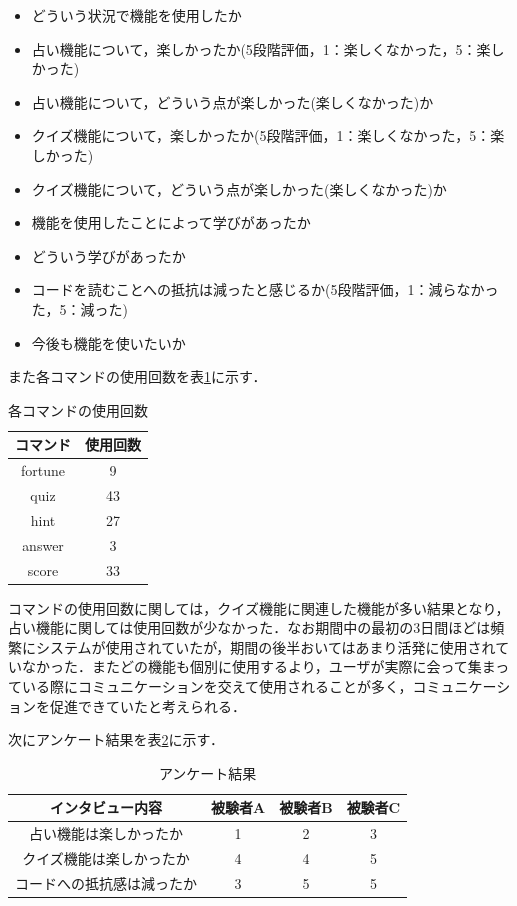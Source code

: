 \begin{itemize}
  \item どういう状況で機能を使用したか
  \item 占い機能について，楽しかったか(5段階評価，1：楽しくなかった，5：楽しかった)
  \item 占い機能について，どういう点が楽しかった(楽しくなかった)か
  \item クイズ機能について，楽しかったか(5段階評価，1：楽しくなかった，5：楽しかった)
  \item クイズ機能について，どういう点が楽しかった(楽しくなかった)か
  \item 機能を使用したことによって学びがあったか
  \item どういう学びがあったか
  \item コードを読むことへの抵抗は減ったと感じるか(5段階評価，1：減らなかった，5：減った)
  \item 今後も機能を使いたいか
\end{itemize}

また各コマンドの使用回数を表\ref{command}に示す．

\begin{table}[!h]
  \centering
  \caption{各コマンドの使用回数}
  \label{command}
    \begin{tabular}{|c|c|} \hline
      コマンド & 使用回数 \\ \hline \hline
      fortune & 9 \\ \hline
      quiz & 43 \\ \hline
      hint & 27 \\ \hline
      answer & 3 \\ \hline
      score & 33 \\ \hline
    \end{tabular}
\end{table}

コマンドの使用回数に関しては，クイズ機能に関連した機能が多い結果となり，占い機能に関しては使用回数が少なかった．なお期間中の最初の3日間ほどは頻繁にシステムが使用されていたが，期間の後半おいてはあまり活発に使用されていなかった．またどの機能も個別に使用するより，ユーザが実際に会って集まっている際にコミュニケーションを交えて使用されることが多く，コミュニケーションを促進できていたと考えられる．

次にアンケート結果を表\ref{interview}に示す．
\begin{table}[!b]
  \centering
  \caption{アンケート結果}
  \label{interview}
    \begin{tabular}{|c|c|c|c|} \hline
      インタビュー内容 & 被験者A & 被験者B & 被験者C \\ \hline \hline
      占い機能は楽しかったか & 1 & 2 & 3 \\ \hline
      クイズ機能は楽しかったか & 4 & 4 & 5 \\ \hline
      コードへの抵抗感は減ったか & 3 & 5 &5 \\ \hline
    \end{tabular}
\end{table}


